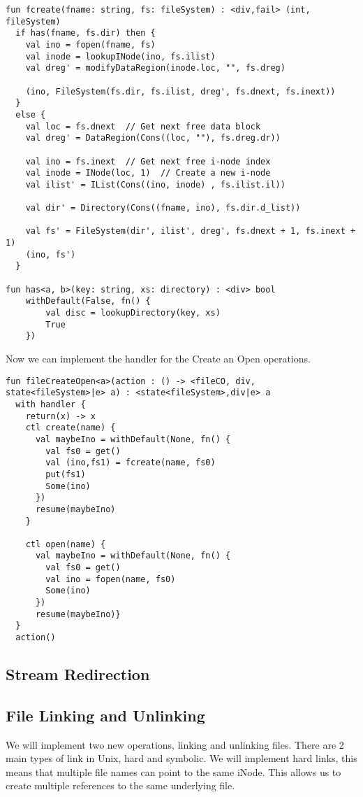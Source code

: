 \documentclass[logo,bsc,singlespacing,parskip]{infthesis}
\begin{document}
\begin{lstlisting}
fun fcreate(fname: string, fs: fileSystem) : <div,fail> (int, fileSystem) 
  if has(fname, fs.dir) then {
    val ino = fopen(fname, fs)  
    val inode = lookupINode(ino, fs.ilist)  
    val dreg' = modifyDataRegion(inode.loc, "", fs.dreg)  

    (ino, FileSystem(fs.dir, fs.ilist, dreg', fs.dnext, fs.inext))  
  }
  else {
    val loc = fs.dnext  // Get next free data block
    val dreg' = DataRegion(Cons((loc, ""), fs.dreg.dr))  

    val ino = fs.inext  // Get next free i-node index
    val inode = INode(loc, 1)  // Create a new i-node
    val ilist' = IList(Cons((ino, inode) , fs.ilist.il))  

    val dir' = Directory(Cons((fname, ino), fs.dir.d_list))  

    val fs' = FileSystem(dir', ilist', dreg', fs.dnext + 1, fs.inext + 1)  
    (ino, fs')
  }

fun has<a, b>(key: string, xs: directory) : <div> bool
    withDefault(False, fn() {
        val disc = lookupDirectory(key, xs)  
        True  
    })
\end{lstlisting}

Now we can implement the handler for the Create an Open operations.

\begin{lstlisting}
fun fileCreateOpen<a>(action : () -> <fileCO, div, state<fileSystem>|e> a) : <state<fileSystem>,div|e> a
  with handler {
    return(x) -> x
    ctl create(name) {
      val maybeIno = withDefault(None, fn() {
        val fs0 = get()
        val (ino,fs1) = fcreate(name, fs0)
        put(fs1)
        Some(ino)
      })
      resume(maybeIno)
    }

    ctl open(name) {
      val maybeIno = withDefault(None, fn() {
        val fs0 = get()
        val ino = fopen(name, fs0)
        Some(ino)
      })
      resume(maybeIno)}  
  }
  action()
\end{lstlisting}

\subsection*{Stream Redirection}

\subsection*{File Linking and Unlinking}
We will implement two new operations, linking and unlinking files. There are 2 main types of link in Unix, hard and symbolic. We will implement hard links, this means that multiple file names can point to the same iNode. This allows us to create multiple references to the same underlying file.
\end{document}
